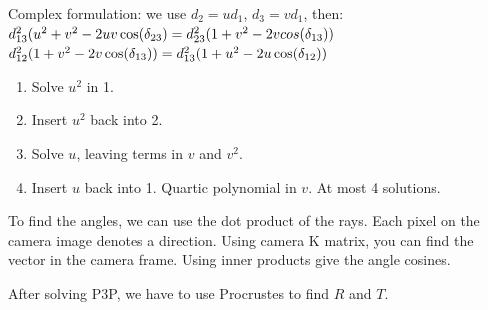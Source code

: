 Complex formulation: we use $d_2 = u d_1$, $d_3 = v d_1$, then:\\
$d_{13}^2 (u^2 + v^2 - 2 u v \cos(\delta_{23}) \\= 
d_{23}^2(1+v^2 - 2 v cos(\delta_{13}))$\\
$d_{12}^2 (1 + v^2 - 2v \cos(\delta_{13})) \\=
d_{13}^2 (1 + u^2 - 2u \cos(\delta_{12}))$
\begin{enumerate}
  \item Solve $u^2$ in 1.
  \item Insert $u^2$ back into 2.
  \item Solve $u$, leaving terms in $v$ and $v^2$.
  \item Insert $u$ back into 1. Quartic polynomial in $v$.
    \alert{At most 4 solutions}.
\end{enumerate}

\alert{To find the angles, we can use the dot product of the rays.}
Each pixel on the camera image denotes a direction. Using camera K matrix, you can find the vector in the camera frame. Using inner products give the angle cosines.

After solving P3P, we have to use Procrustes to find $R$ and $T$.
